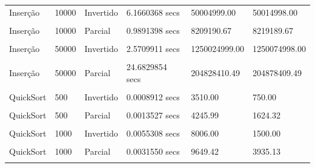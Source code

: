\documentclass[
]{article}
\begin{document}
\begin{longtable}[l]{llllll}
Inserção & 10000 & Invertido & 6.1660368 secs & 50004999.00 & 50014998.00\\
\cellcolor{gray!15}{Inserção} & \cellcolor{gray!15}{10000} & \cellcolor{gray!15}{Ordenado} & \cellcolor{gray!15}{0.0013168 secs} & \cellcolor{gray!15}{9999.00} & \cellcolor{gray!15}{19998.00}\\
Inserção & 10000 & Parcial & 0.9891398 secs & 8209190.67 & 8219189.67\\
\cellcolor{gray!15}{Inserção} & \cellcolor{gray!15}{50000} & \cellcolor{gray!15}{Aleatório} & \cellcolor{gray!15}{1.2550940 secs} & \cellcolor{gray!15}{625139777.91} & \cellcolor{gray!15}{625189776.91}\\
Inserção & 50000 & Invertido & 2.5709911 secs & 1250024999.00 & 1250074998.00\\
\cellcolor{gray!15}{Inserção} & \cellcolor{gray!15}{50000} & \cellcolor{gray!15}{Ordenado} & \cellcolor{gray!15}{0.0066781 secs} & \cellcolor{gray!15}{49999.00} & \cellcolor{gray!15}{99998.00}\\
Inserção & 50000 & Parcial & 24.6829854 secs & 204828410.49 & 204878409.49\\
\cellcolor{gray!15}{QuickSort} & \cellcolor{gray!15}{500} & \cellcolor{gray!15}{Aleatório} & \cellcolor{gray!15}{0.0016056 secs} & \cellcolor{gray!15}{4693.96} & \cellcolor{gray!15}{3134.49}\\
QuickSort & 500 & Invertido & 0.0008912 secs & 3510.00 & 750.00\\
\cellcolor{gray!15}{QuickSort} & \cellcolor{gray!15}{500} & \cellcolor{gray!15}{Ordenado} & \cellcolor{gray!15}{0.0009573 secs} & \cellcolor{gray!15}{3753.00} & \cellcolor{gray!15}{0.00}\\
QuickSort & 500 & Parcial & 0.0013527 secs & 4245.99 & 1624.32\\
\cellcolor{gray!15}{QuickSort} & \cellcolor{gray!15}{1000} & \cellcolor{gray!15}{Aleatório} & \cellcolor{gray!15}{0.0042355 secs} & \cellcolor{gray!15}{10498.21} & \cellcolor{gray!15}{6969.87}\\
QuickSort & 1000 & Invertido & 0.0055308 secs & 8006.00 & 1500.00\\
\cellcolor{gray!15}{QuickSort} & \cellcolor{gray!15}{1000} & \cellcolor{gray!15}{Ordenado} & \cellcolor{gray!15}{0.0020545 secs} & \cellcolor{gray!15}{8498.00} & \cellcolor{gray!15}{0.00}\\
QuickSort & 1000 & Parcial & 0.0031550 secs & 9649.42 & 3935.13\\
\cellcolor{gray!15}{QuickSort} & \cellcolor{gray!15}{5000} & \cellcolor{gray!15}{Aleatório} & \cellcolor{gray!15}{0.0350165 secs} & \cellcolor{gray!15}{65796.11} & \cellcolor{gray!15}{42854.85}\\

\end{longtable}
\end{document}
